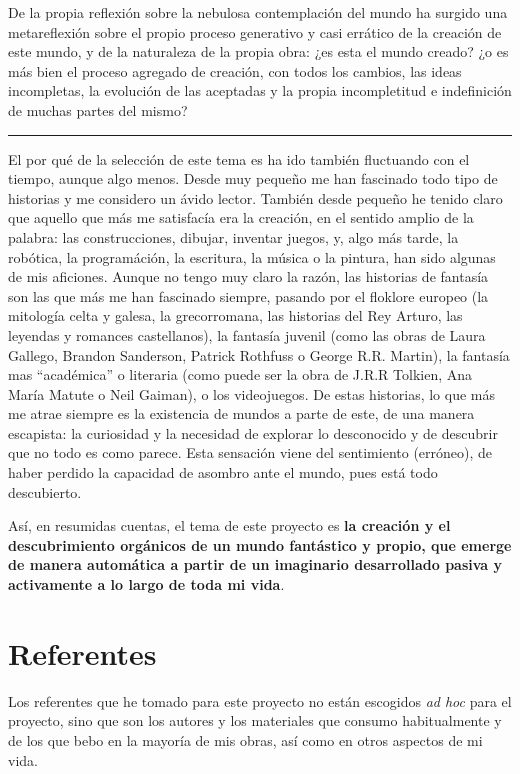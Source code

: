 De la propia reflexión sobre la nebulosa contemplación del mundo ha
surgido una metareflexión sobre el propio proceso generativo y casi
errático de la creación de este mundo, y de la naturaleza de la propia
obra: ¿es esta el mundo creado? ¿o es más bien el proceso agregado de
creación, con todos los cambios, las ideas incompletas, la evolución de
las aceptadas y la propia incompletitud e indefinición de muchas partes
del mismo?

\begin{center}\rule{0.5\linewidth}{0.5pt}\end{center}

El por qué de la selección de este tema es ha ido también fluctuando con
el tiempo, aunque algo menos. Desde muy pequeño me han fascinado todo
tipo de historias y me considero un ávido lector. También desde pequeño
he tenido claro que aquello que más me satisfacía era la creación, en el
sentido amplio de la palabra: las construcciones, dibujar, inventar
juegos, y, algo más tarde, la robótica, la programáción, la escritura,
la música o la pintura, han sido algunas de mis aficiones. Aunque no
tengo muy claro la razón, las historias de fantasía son las que más me
han fascinado siempre, pasando por el floklore europeo (la mitología
celta y galesa, la grecorromana, las historias del Rey Arturo, las
leyendas y romances castellanos), la fantasía juvenil (como las obras de
Laura Gallego, Brandon Sanderson, Patrick Rothfuss o George R.R.
Martin), la fantasía mas ``académica'' o literaria (como puede ser la
obra de J.R.R Tolkien, Ana María Matute o Neil Gaiman), o los
videojuegos. De estas historias, lo que más me atrae siempre es la
existencia de mundos a parte de este, de una manera escapista: la
curiosidad y la necesidad de explorar lo desconocido y de descubrir que
no todo es como parece. Esta sensación viene del sentimiento (erróneo),
de haber perdido la capacidad de asombro ante el mundo, pues está todo
descubierto.

Así, en resumidas cuentas, el tema de este proyecto es \textbf{la
creación y el descubrimiento orgánicos de un mundo fantástico y propio,
que emerge de manera automática a partir de un imaginario desarrollado
pasiva y activamente a lo largo de toda mi vida}.

\hypertarget{referentes}{%
\section{Referentes}\label{referentes}}

Los referentes que he tomado para este proyecto no están escogidos
\emph{ad hoc} para el proyecto, sino que son los autores y los
materiales que consumo habitualmente y de los que bebo en la mayoría de
mis obras, así como en otros aspectos de mi vida.

